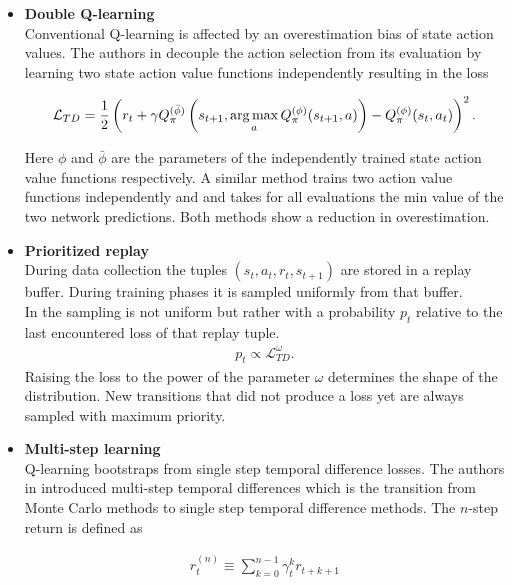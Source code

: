 \begin{itemize}
	\item \textbf{Double Q-learning} \label{text:doublQ}\\
	Conventional Q-learning is affected by an overestimation bias of state action values. The authors in \cite{DBLP:journals/corr/HasseltGS15} decouple the action selection from its evaluation by learning two state action value functions independently resulting in the loss
	
	\begin{align}
		\mathcal{L}_{TD} = \frac{1}{2} \left(r_{t} + \gamma Q_{\pi}^{(\bar{\phi})} \left( s_{t+1}, \operatorname*{arg\,max}_{a}Q_{\pi}^{(\phi)}(s_{t+1}, a) \right) - Q_{\pi}^{(\phi)}(s_t, a_t)\right)^2\text{.}
	\end{align}
	
	Here $\phi$ and $\bar{\phi}$ are the parameters of the independently trained state action value functions respectively. A similar method trains two action value functions independently and and takes for all evaluations the min value of the two network predictions. Both methods show a reduction in overestimation.
	
	\item \textbf{Prioritized replay}\\
	During data collection the tuples $(s_t, a_t, r_{t}, s_{t+1})$ are stored in a replay buffer. During training phases it is sampled uniformly from that buffer.\\
	In \cite{schaul2015prioritized} the sampling is not uniform but rather with a probability $p_t$ relative to the last encountered loss of that replay tuple.
	\begin{align}
		p_t \propto \mathcal{L}_{TD} ^ \omega \text{.}
	\end{align}
	Raising the loss to the power of the parameter $\omega$ determines the shape of the distribution. New transitions that did not produce a loss yet are always sampled with maximum priority.
	
	\item \textbf{Multi-step learning}\\
	Q-learning bootstraps from single step temporal difference losses. The authors in \cite{SBQL} introduced multi-step temporal differences which is the transition from Monte Carlo methods to single step temporal difference methods. The $n$-step return is defined as 
	
	\begin{align}
		r_t^{(n)} \equiv \sum_{k=0}^{n-1} \gamma_t^{k} r_{t+k+1}
	\end{align}
	

\end{itemize}
